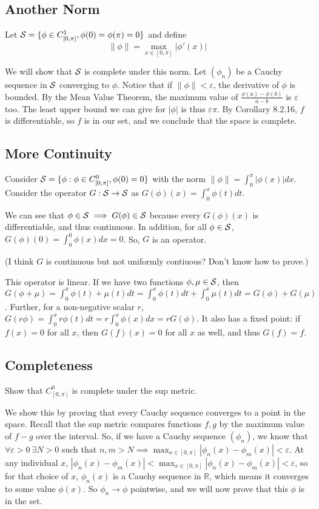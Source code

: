 \documentclass[11pt]{article}
\newcommand{\R}{\mathbb{R}}
\renewcommand{\S}{{\cal S}}
\begin{document}
\subsection*{Another Norm}


Let $\S = \{\phi\in C_{[0,\pi]}^1,\phi(0)=\phi(\pi)=0\}$ and define
\[
\|\phi\|=\max_{x\in[0,\pi]}|\phi'(x)|
\]

We will show that $\S$ is complete under this norm.
Let $(\phi_n)$ be a Cauchy sequence in $\S$ converging to $\phi$. 
Notice that if $\|\phi\|<\varepsilon$, the derivative of $\phi$ is bounded.
By the Mean Value Theorem, the maximum value of $\frac{\phi(a)-\phi(b)}{a-b}$ is 
$\varepsilon$ too. The least upper bound we can give for $|\phi|$ is thus $\varepsilon\pi$.
By Corollary 8.2.16, $f$ is differentiable, so $f$ is in our set, and we conclude
that the space is complete.


\subsection*{More Continuity}

Consider $\S = \{ \phi:\phi\in C_{[0,\pi]}^0,\phi(0)=0 \}$ with the norm
$\|\phi\|=\int_0^\pi|\phi(x)|dx$.
Consider the operator $G:\S\to\S$ as $G(\phi)(x)=\int_0^x\phi(t)dt$.

We can see that $\phi\in\S\implies G(\phi)\in\S$ because every $G(\phi)(x)$
is differentiable, and thus continuous. In addition, for all $\phi\in\S$,
$G(\phi)(0)=\int_0^0\phi(x)dx=0$. So, $G$ is an operator.

(I think $G$ is continuous but not uniformly contiuous? Don't know how to prove.)

This operator is linear. If we have two functions $\phi,\mu\in\S$, then
$G(\phi+\mu)=\int_0^x\phi(t)+\mu(t) dt=\int_0^x\phi(t)dt+\int_0^x\mu(t)dt=G(\phi)+G(\mu)$.
Further, for a non-negative scalar $r$,
$G(r\phi)=\int_0^xr\phi(t)dt=r\int_0^x\phi(x)dx=rG(\phi)$.
It also has a fixed point: if $f(x)=0$ for all $x$, then $G(f)(x)=0$ for all $x$ as well,
and thus $G(f)=f$.

\subsection*{Completeness}

Show that $C_{[0,\pi]}^0$ is complete under the sup metric. 

We show this by proving that every Cauchy sequence converges to a point in the space.
Recall that the sup metric compares functions $f,g$ by the maximum value of
$f-g$ over the interval. So, if we have a Cauchy sequence $(\phi_n)$, we know that
$\forall\varepsilon>0\ \exists N>0$ such that
$n,m>N\implies\max_{x\in[0,\pi]}|\phi_n(x)-\phi_m(x)|<\varepsilon$.
At any individual $x$,
$|\phi_n(x)-\phi_m(x)|<\max_{x\in[0,\pi]}|\phi_n(x)-\phi_m(x)|<\varepsilon$, so
for that choice of $x$, $\phi_n(x)$ is a Cauchy sequence in $\R$, which means
it converges to some value $\phi(x)$. So $\phi_n\to\phi$ pointwise, and we will now prove
that this $\phi$ is in the set.
\end{document}
